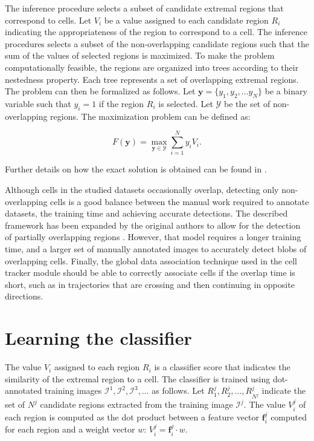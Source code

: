 	The inference procedure selects a subset of candidate extremal regions that correspond to cells. Let $V_i$ be a value assigned to each candidate region $R_i$ indicating the appropriateness of the region to correspond to a cell. The inference procedures selects a subset of the non-overlapping candidate regions such that the sum of the values of selected regions is maximized. To make the problem computationally feasible, the regions are organized into trees according to their nestedness property. Each tree represents a set of overlapping extremal regions. The problem can then be formalized as follows. Let $\textbf{y} = \{y_1, y_2, \dots y_N\}$ be a binary variable such that $y_i = 1$ if the region $R_i$ is selected. Let $\mathcal{Y}$ be the set of non-overlapping regions. The maximization problem can be defined as:
	
	\[
		F(\textbf{y}) = \max_{\textbf{y} \in \mathcal{Y}} \sum_{i=1}^N y_i V_i \text{.}
	\]
	
	Further details on how the exact solution is obtained can be found in \cite{arteta12}.
	
	Although cells in the studied datasets occasionally overlap, detecting only non-overlapping cells is a good balance between the manual work required to annotate datasets, the training time and achieving accurate detections. The described framework has been expanded by the original authors to allow for the detection of partially overlapping regions \cite{arteta13}. However, that model requires a longer training time, and a larger set of manually annotated images to accurately detect blobs of overlapping cells. Finally, the global data association technique used in the cell tracker module should be able to correctly associate cells if the overlap time is short, such as in trajectories that are crossing and then continuing in opposite directions.
	
	
	\section{Learning the classifier}
	\label{sec:detector_classifier}
	
	The value $V_i$ assigned to each region $R_i$ is a classifier score that indicates the similarity of the extremal region to a cell. The classifier is trained using dot-annotated training images $\mathcal{I}^1, \mathcal{I}^2, \mathcal{I}^3, \dots$ as follows. Let $R_1^j, R_2^j,\dots,R_{N^j}^j$ indicate the set of $N^j$ candidate regions extracted from the training image $\mathcal{I}^j$. The value $V_i^j$ of each region is computed as the dot product between a feature vector $\textbf{f}_i^j$ computed for each region and a weight vector $w$: $V_i^j = \textbf{f}_i^j \cdot w$.
	
